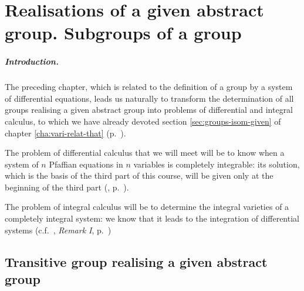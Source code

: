 \chapter{Realisations of a given abstract group. Subgroups of a group}
\label{cha:real-given-abstr}

\paragraph{Introduction.}
\label{sec:115}
The preceding chapter, which is related to the definition of a group by a system of differential equations, leads us naturally to transform the determination of all groups realising a given abstract group into problems of differential and integral calculus, to which we have already devoted section \ref{sec:groups-isom-given} of chapter \ref{cha:vari-relat-that} (p.~\pageref{sec:groups-isom-given}).

The problem of differential calculus that we will meet will be to know when a system of $n$ Pfaffian equations in $n$ variables is completely integrable: its solution, which is the basis of the third part of this course, will be given only at the beginning of the third part (, p.~\pageref{sec:166}). 

The problem of integral calculus will be to determine the integral varieties of a completely integral system: we know that it leads to the integration of differential systems (c.f.~, \emph{Remark I}, p.~\pageref{sec:84})

\section{Transitive group realising a given abstract group}
\label{sec:trans-group-real}

